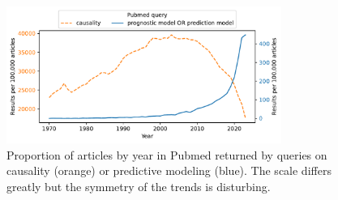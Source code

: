 \documentclass[french,12pt,twoside,a4paper]{book}
\begin{document}
\begin{figure}
  \centering
  \includegraphics[width=0.8\textwidth]{img/chapter_1/pubmed_query.pdf}
  \caption{Proportion of articles by year in Pubmed returned by queries on
    causality (orange) or predictive modeling (blue). The scale differs greatly
    but the symmetry of the trends is disturbing.}%
  \label{fig:intro:pubmed_query}
\end{figure}
\end{document}
